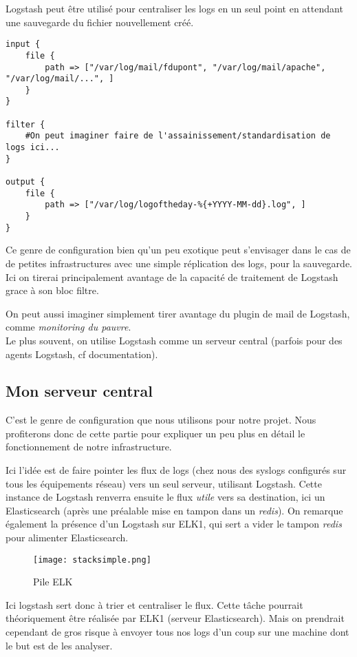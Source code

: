 Logstash peut être utilisé pour centraliser les logs en un seul point en attendant
une sauvegarde du fichier nouvellement créé.


\begin{lstlisting}[style=logstash,label={lst:conflogstashminimale2},caption={Un autre exemple de configuration minimale}]
input {
    file {
        path => ["/var/log/mail/fdupont", "/var/log/mail/apache", "/var/log/mail/...", ]
    }
}

filter {
    #On peut imaginer faire de l'assainissement/standardisation de logs ici...
}

output {
    file {
        path => ["/var/log/logoftheday-%{+YYYY-MM-dd}.log", ]
    }
}
\end{lstlisting}
Ce genre de configuration bien qu'un peu exotique peut s'envisager dans le cas de
de petites infrastructures avec une simple réplication des logs, pour la sauvegarde.
Ici on tirerai principalement avantage de la capacité de traitement de Logstash grace
à son bloc filtre.

On peut aussi imaginer simplement tirer avantage du plugin de mail de Logstash, 
comme \textit{monitoring du pauvre}.\\[4mm]

Le plus souvent, on utilise Logstash comme un serveur central (parfois pour 
des agents Logstash, cf documentation).

\subsection{Mon serveur central}
C'est le genre de configuration que nous utilisons pour notre projet. Nous profiterons
donc de cette partie pour expliquer un peu plus en détail le fonctionnement de notre
infrastructure.

Ici l'idée est de faire pointer les flux de \gls{logs} (chez nous des syslogs configurés 
sur tous les équipements réseau) vers un seul serveur, utilisant Logstash. Cette 
instance de Logstash renverra ensuite le flux \textit{utile} vers sa destination, 
ici un Elasticsearch (après une préalable mise en tampon dans un \textit{redis}).
On remarque également la présence d'un Logstash sur ELK1, qui sert a vider le tampon
\textit{redis} pour alimenter Elasticsearch.
\begin{figure}[H]
\center
\texttt{[image: stacksimple.png]}
\label{fig:elkstack1}
\caption{Pile ELK}
\end{figure}

Ici logstash sert donc à trier et centraliser le flux. Cette tâche pourrait théoriquement 
être réalisée par ELK1 (serveur Elasticsearch).
Mais on prendrait cependant de gros risque à envoyer tous nos logs d'un coup sur une machine
dont le but est de les analyser.


